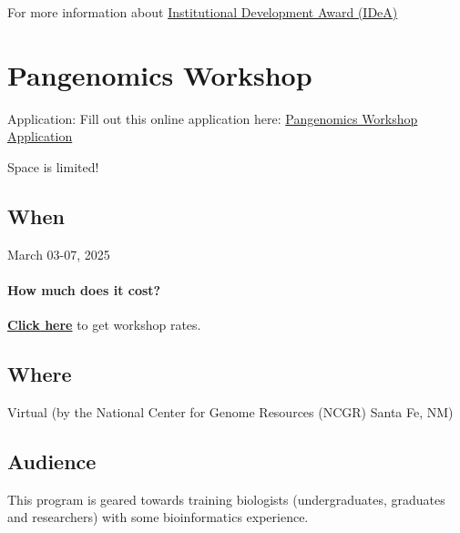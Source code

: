 \documentclass[
]{book}
\begin{document}
For more information about \href{https://www.nigms.nih.gov/capacity-building/division-for-research-capacity-building/institutional-development-award-\%28idea\%29}{Institutional Development Award (IDeA)}

\hypertarget{pangenomics-workshop}{%
\chapter*{Pangenomics Workshop}\label{pangenomics-workshop}}

Application: Fill out this online application here: \href{https://docs.google.com/forms/d/e/1FAIpQLScJPueRpT0M4CHb2RjJI5DGHTXu6mutGBVBoOMCEQsO2JnQ1A/viewform}{Pangenomics Workshop Application}

Space is limited!

\hypertarget{when-2}{%
\section*{When}\label{when-2}}

March 03-07, 2025

\hypertarget{how-much-does-it-cost-2}{%
\subsubsection*{How much does it cost?}\label{how-much-does-it-cost-2}}

\href{https://inbre.ncgr.org/ncgr-workshops/workshop-rates.html}{\textbf{Click here}} to get workshop rates.

\hypertarget{where}{%
\section*{Where}\label{where}}

Virtual (by the National Center for Genome Resources (NCGR) Santa Fe, NM)

\hypertarget{audience}{%
\section*{Audience}\label{audience}}

This program is geared towards training biologists (undergraduates, graduates and researchers) with some bioinformatics experience.
\end{document}
